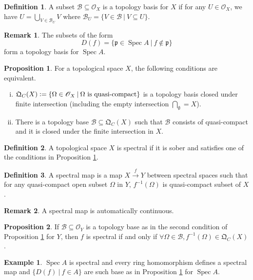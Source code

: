 \documentclass[10pt]{article}
\numberwithin{equation}{section}
\theoremstyle{definition}
\newtheorem{proposition}{Proposition}[subsection]
\newtheorem{definition}{Definition}[subsection]
\newtheorem{remark}{Remark}[subsection]
\newtheorem{example}{Example}[subsection]
\DeclareMathOperator{\Spec}{Spec}
\newcommand{\defeq}{\vcentcolon=}
\newcommand{\Ouv}{\mathscr{O}}
\newcommand{\sep}[0]{\:|\:}
\newcommand{\QC}[0]{\mathfrak{Q}_C}
\begin{document}
\begin{definition}
    A subset $\mathcal{B}\subseteq\Ouv_X$ is a topology basis for $X$ if for any $U\in\Ouv_X$, we have $U=\bigcup_{V\in\mathcal{B}_U}V$ where $\mathcal{B}_U=\{V\in\mathcal{B}\sep V\subseteq U\}$.
\end{definition}
\begin{remark}
    The subsets of the form
    \begin{equation*}
        D(f) = \{\mathfrak{p}\in\Spec A\sep f\not\in \mathfrak{p}\}
    \end{equation*}
    form a topology basis for $\Spec A$.
\end{remark}
\begin{proposition}
    \label{proposition_2_5}
    \label{fact_5}
    For a topological space $X$, the following conditions are equivalent.
    \begin{enumerate}[i.]
        \item $\QC(X) \defeq \{\Omega\in\Ouv_X\sep \Omega\text{ is quasi-compact}\}$ is a topology basis closed under finite intersection (including the empty intersection $\bigcap_\emptyset = X$).
        \item There is a topology base $\mathcal{B}\subseteq\QC(X)$ such that $\mathcal{B}$ consists of quasi-compact and it is closed under the finite intersection in $X$.
    \end{enumerate}
\end{proposition}
\begin{definition}
    A topological space $X$ is spectral if it is sober and satisfies one of the conditions in Proposition \ref{proposition_2_5}.
\end{definition}
\begin{definition}
    A spectral map is a map $X\stackrel{f}{\to}Y$ between spectral spaces such that for any quasi-compact open subset $\Omega$ in $Y$, $f^{-1}(\Omega)$ is quasi-compact subset of $X$.
\end{definition}
\begin{remark}
    A spectral map is automatically continuous.
\end{remark}
\begin{proposition}
    \label{facr1.2.6}
    If $\mathcal{B}\subseteq \Ouv_Y$ is a topology base as in the second condition of Proposition \ref{proposition_2_5} for $Y$, then $f$ is spectral if and only if $\forall \Omega\in\mathcal{B},f^{-1}(\Omega)\in\QC(X)$.
\end{proposition}
\begin{example}
    $\Spec A$ is spectral and every ring homomorphism defines a spectral map and $\{D(f)\sep f\in A\}$ are such base as in Proposition \ref{proposition_2_5} for $\Spec A$.
\end{example}
\end{document}
